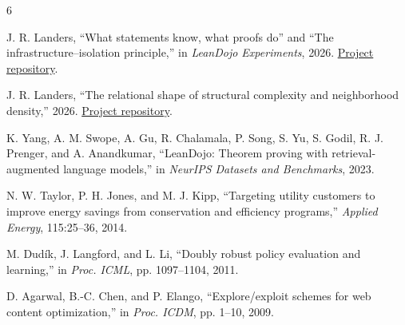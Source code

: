 \documentclass[11pt]{article}
\theoremstyle{noteplain}
\theoremstyle{definition}
\begin{document}
\begin{thebibliography}{6}\footnotesize
\setlength{\itemsep}{.15ex}
\setlength{\parskip}{0pt}

J. R. Landers, ``What statements know, what proofs do'' and ``The infrastructure--isolation principle,'' in \emph{LeanDojo Experiments}, 2026. \href{https://github.com/jonland82/leandojo-experiments}{Project repository}.

J. R. Landers, ``The relational shape of structural complexity and neighborhood density,'' 2026. \href{https://github.com/jonland82/compatible-histories}{Project repository}.

K. Yang, A. M. Swope, A. Gu, R. Chalamala, P. Song, S. Yu, S. Godil, R. J. Prenger, and A. Anandkumar, ``LeanDojo: Theorem proving with retrieval-augmented language models,'' in \emph{NeurIPS Datasets and Benchmarks}, 2023.

N. W. Taylor, P. H. Jones, and M. J. Kipp, ``Targeting utility customers to improve energy savings from conservation and efficiency programs,'' \emph{Applied Energy}, 115:25--36, 2014.

M. Dud\'{i}k, J. Langford, and L. Li, ``Doubly robust policy evaluation and learning,'' in \emph{Proc. ICML}, pp. 1097--1104, 2011.

D. Agarwal, B.-C. Chen, and P. Elango, ``Explore/exploit schemes for web content optimization,'' in \emph{Proc. ICDM}, pp. 1--10, 2009.

\end{thebibliography}
\end{document}
